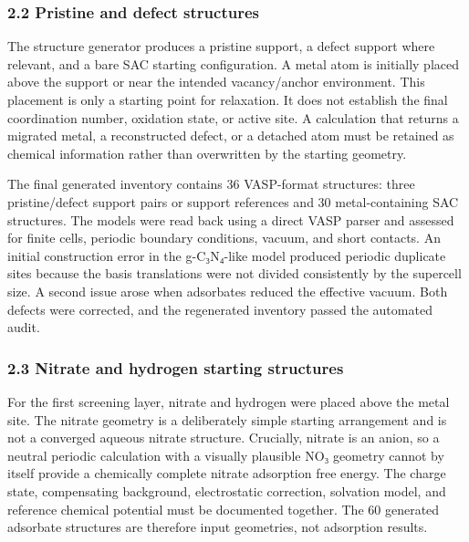\documentclass[
]{article}
\begin{document}
\hypertarget{pristine-and-defect-structures}{%
\subsubsection{2.2 Pristine and defect
structures}\label{pristine-and-defect-structures}}

The structure generator produces a pristine support, a defect support
where relevant, and a bare SAC starting configuration. A metal atom is
initially placed above the support or near the intended vacancy/anchor
environment. This placement is only a starting point for relaxation. It
does not establish the final coordination number, oxidation state, or
active site. A calculation that returns a migrated metal, a
reconstructed defect, or a detached atom must be retained as chemical
information rather than overwritten by the starting geometry.

The final generated inventory contains 36 VASP-format structures: three
pristine/defect support pairs or support references and 30
metal-containing SAC structures. The models were read back using a
direct VASP parser and assessed for finite cells, periodic boundary
conditions, vacuum, and short contacts. An initial construction error in
the g-C₃N₄-like model produced periodic duplicate sites because the
basis translations were not divided consistently by the supercell size.
A second issue arose when adsorbates reduced the effective vacuum. Both
defects were corrected, and the regenerated inventory passed the
automated audit.

\hypertarget{nitrate-and-hydrogen-starting-structures}{%
\subsubsection{2.3 Nitrate and hydrogen starting
structures}\label{nitrate-and-hydrogen-starting-structures}}

For the first screening layer, nitrate and hydrogen were placed above
the metal site. The nitrate geometry is a deliberately simple starting
arrangement and is not a converged aqueous nitrate structure. Crucially,
nitrate is an anion, so a neutral periodic calculation with a visually
plausible NO₃ geometry cannot by itself provide a chemically complete
nitrate adsorption free energy. The charge state, compensating
background, electrostatic correction, solvation model, and reference
chemical potential must be documented together. The 60 generated
adsorbate structures are therefore input geometries, not adsorption
results.
\end{document}
